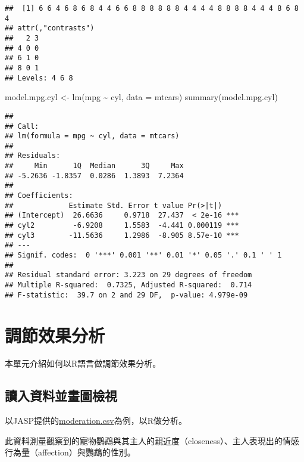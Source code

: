 \documentclass[
]{book}
\newenvironment{Shaded}{\begin{snugshade}}{\end{snugshade}}
\newcommand{\AttributeTok}[1]{\textcolor[rgb]{0.77,0.63,0.00}{#1}}
\newcommand{\FunctionTok}[1]{\textcolor[rgb]{0.00,0.00,0.00}{#1}}
\newcommand{\NormalTok}[1]{#1}
\newcommand{\OtherTok}[1]{\textcolor[rgb]{0.56,0.35,0.01}{#1}}
\newcommand{\SpecialCharTok}[1]{\textcolor[rgb]{0.00,0.00,0.00}{#1}}
\begin{document}
\begin{verbatim}
##  [1] 6 6 4 6 8 6 8 4 4 6 6 8 8 8 8 8 8 4 4 4 4 8 8 8 8 4 4 4 8 6 8 4
## attr(,"contrasts")
##   2 3
## 4 0 0
## 6 1 0
## 8 0 1
## Levels: 4 6 8
\end{verbatim}

\begin{Shaded}
\begin{Highlighting}[]
\NormalTok{model.mpg.cyl }\OtherTok{\textless{}{-}} \FunctionTok{lm}\NormalTok{(mpg }\SpecialCharTok{\textasciitilde{}}\NormalTok{ cyl, }\AttributeTok{data =}\NormalTok{ mtcars)}
\FunctionTok{summary}\NormalTok{(model.mpg.cyl)}
\end{Highlighting}
\end{Shaded}

\begin{verbatim}
## 
## Call:
## lm(formula = mpg ~ cyl, data = mtcars)
## 
## Residuals:
##     Min      1Q  Median      3Q     Max 
## -5.2636 -1.8357  0.0286  1.3893  7.2364 
## 
## Coefficients:
##             Estimate Std. Error t value Pr(>|t|)    
## (Intercept)  26.6636     0.9718  27.437  < 2e-16 ***
## cyl2         -6.9208     1.5583  -4.441 0.000119 ***
## cyl3        -11.5636     1.2986  -8.905 8.57e-10 ***
## ---
## Signif. codes:  0 '***' 0.001 '**' 0.01 '*' 0.05 '.' 0.1 ' ' 1
## 
## Residual standard error: 3.223 on 29 degrees of freedom
## Multiple R-squared:  0.7325, Adjusted R-squared:  0.714 
## F-statistic:  39.7 on 2 and 29 DF,  p-value: 4.979e-09
\end{verbatim}

\hypertarget{moderation}{%
\chapter{調節效果分析}\label{moderation}}

本單元介紹如何以R語言做調節效果分析。

\hypertarget{ux8b80ux5165ux8cc7ux6599ux4e26ux756bux5716ux6aa2ux8996}{%
\section{讀入資料並畫圖檢視}\label{ux8b80ux5165ux8cc7ux6599ux4e26ux756bux5716ux6aa2ux8996}}

以JASP提供的\href{https://jasp-stats.org/wp-content/uploads/2020/03/moderation.csv}{moderation.csv}為例，以R做分析。

此資料測量觀察到的寵物鸚鵡與其主人的親近度（closeness）、主人表現出的情感行為量（affection）與鸚鵡的性別。
\end{document}
